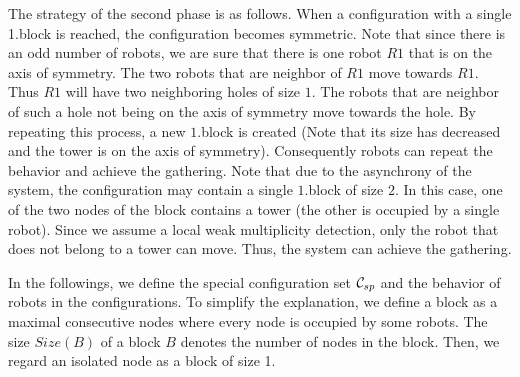 \documentclass[11pt]{article}
\newcommand{\CONF}{{\cal C}}
\begin{document}
The strategy of the second phase is as follows. 
When a configuration with a single 1.block is reached, the configuration becomes symmetric. Note that since there is an odd number of robots, we are sure that there is one robot $R1$ that is on the axis of symmetry. 
The two robots that are neighbor of $R1$ move towards $R1$. 
Thus $R1$ will have two neighboring holes of size $1$. 
The robots that are neighbor of such a hole not being on the axis of symmetry move towards the hole. 
By repeating this process, a new $1$.block is created (Note that its size has decreased and the tower is on the axis of symmetry). 
Consequently robots can repeat the behavior and achieve the gathering. 
Note that due to the asynchrony of the system, the configuration may contain a single $1$.block of size $2$. 
In this case, one of the two nodes of the block contains a tower (the other is occupied by a single robot). 
Since we assume a local weak multiplicity detection, only the robot that does not belong to a tower can move. 
Thus, the system can achieve the gathering. 

In the followings, we define the special configuration set $\CONF_{sp}$ and the behavior of robots in the configurations. To simplify the explanation, we define a block as a maximal consecutive nodes where every node is occupied by some robots. The size $Size(B)$ of a block $B$ denotes the number of nodes in the block. Then, we regard an isolated node as a block of size 1. 
\end{document}
